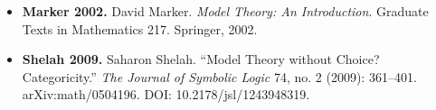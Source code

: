 \documentclass[
  english,
  11pt,
  reqno]{amsart}
\providecommand{\tightlist}{%
  \setlength{\itemsep}{0pt}\setlength{\parskip}{0pt}}
\begin{document}
\protect{}\label{ref:marker2002}

\begin{itemize}
\tightlist
\item
  \textbf{Marker 2002.} David Marker. \emph{Model Theory: An
  Introduction}. Graduate Texts in Mathematics 217. Springer, 2002.
\end{itemize}

\protect{}\label{ref:shelah2009}

\begin{itemize}
\tightlist
\item
  \textbf{Shelah 2009.} Saharon Shelah. ``Model Theory without Choice?
  Categoricity.'' \emph{The Journal of Symbolic Logic} 74, no. 2 (2009):
  361--401. arXiv:math/0504196. DOI: 10.2178/jsl/1243948319.
\end{itemize}
\end{document}
